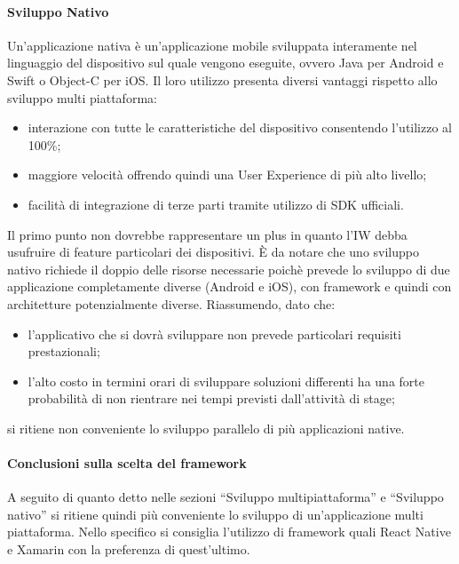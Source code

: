 \paragraph{Sviluppo Nativo}
Un’applicazione nativa è un’applicazione mobile sviluppata interamente nel linguaggio del dispositivo sul quale vengono eseguite, ovvero Java per Android e Swift o Object-C per iOS. Il loro utilizzo presenta diversi vantaggi rispetto allo sviluppo multi piattaforma:
\begin{itemize}
    \item interazione con tutte le caratteristiche del dispositivo consentendo l’utilizzo al 100\%;
    \item maggiore velocità offrendo quindi una User Experience di più alto livello;
    \item facilità di integrazione di terze parti tramite utilizzo di SDK ufficiali. 
\end{itemize}
Il primo punto non dovrebbe rappresentare un plus in quanto l’IW debba usufruire di feature particolari dei dispositivi. 
È da notare che uno sviluppo nativo richiede il doppio delle risorse necessarie poichè prevede lo sviluppo di due applicazione completamente diverse (Android e iOS), con framework e quindi con architetture potenzialmente diverse. 
Riassumendo, dato che: 
\begin{itemize}
    \item l’applicativo che si dovrà sviluppare non prevede particolari requisiti prestazionali;
    \item l’alto costo in termini orari di sviluppare soluzioni differenti ha una forte probabilità di non rientrare nei tempi previsti dall’attività di stage;
\end{itemize}
 si ritiene non conveniente lo sviluppo parallelo di più applicazioni native. 
\paragraph{Conclusioni sulla scelta del framework}
A seguito di quanto detto nelle sezioni “Sviluppo multipiattaforma” e “Sviluppo nativo” si ritiene quindi più conveniente lo sviluppo di un’applicazione multi piattaforma. Nello specifico si consiglia l’utilizzo di framework quali React Native e Xamarin con la preferenza di quest’ultimo.
